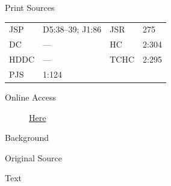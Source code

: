 			\begin{description}
				\item[Print Sources]
			\end{description}

				\begin{tabular}{p{0.5in}p{1in}p{0.5in}p{1in}}
				JSP	 	& D5:38--39; J1:86	& JSR 		& 275 \\
				DC	 	& --- 			& HC 		& 2:304 \\
				HDDC 	& ---			& TCHC 		& 2:295 \\
				PJS 	& 1:124			& 	 		&  \\
				\end{tabular}
			
			\begin{description}
				\item[Online Access] \href{https://www.josephsmithpapers.org/paper-summary/revelation-8-november-1835/1}{Here}
			\end{description}
			
			\begin{description}
				\item[Background]
			\end{description}
			
			
			\begin{description}
				\item[Original Source]
			\end{description}
			
			
			\begin{description}
				\item[Text]
			\end{description}
			

